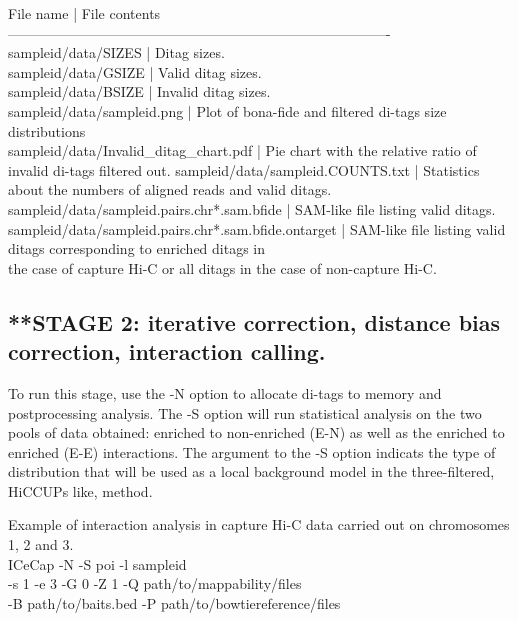 \documentclass[10pt,a4paper]{article}
\begin{document}
File name                                                         |  File contents\\
----------------------------------------------------------------------------------\\
sampleid/data/SIZES                                     |  Ditag sizes.\\
sampleid/data/GSIZE                                     |  Valid ditag sizes.\\
sampleid/data/BSIZE                                     |  Invalid ditag sizes.\\
sampleid/data/sampleid.png                            |  Plot of bona-fide and filtered di-tags size distributions \\
sampleid/data/Invalid\_ditag\_chart.pdf                 |  Pie chart with the relative ratio of invalid di-tags filtered out.
sampleid/data/sampleid.COUNTS.txt                     |  Statistics about the numbers of aligned reads and valid ditags.\\
sampleid/data/sampleid.pairs.chr*.sam.bfide           |  SAM-like file listing valid ditags.\\
sampleid/data/sampleid.pairs.chr*.sam.bfide.ontarget  |  SAM-like file listing valid ditags corresponding to enriched ditags in \\
                                                                     the case of capture Hi-C or all ditags in the case of non-capture Hi-C.\\

\subsection{**STAGE 2: iterative correction, distance bias correction, interaction calling.}

To run this stage, use the -N option to allocate di-tags to memory and postprocessing analysis.
The -S option will run statistical analysis on the two pools of data obtained: enriched to non-enriched (E-N) as well as the enriched to enriched (E-E) interactions.
The argument to the -S option indicats the type of distribution that will be used as a local background model in the three-filtered, HiCCUPs like, method.  

Example of interaction analysis in capture Hi-C data carried out on chromosomes 1, 2 and 3.
\\
ICeCap -N -S poi -l sampleid \\
-s 1 -e 3 -G 0 -Z 1 -Q path/to/mappability/files\\
-B path/to/baits.bed -P path/to/bowtiereference/files \\
\end{document}
